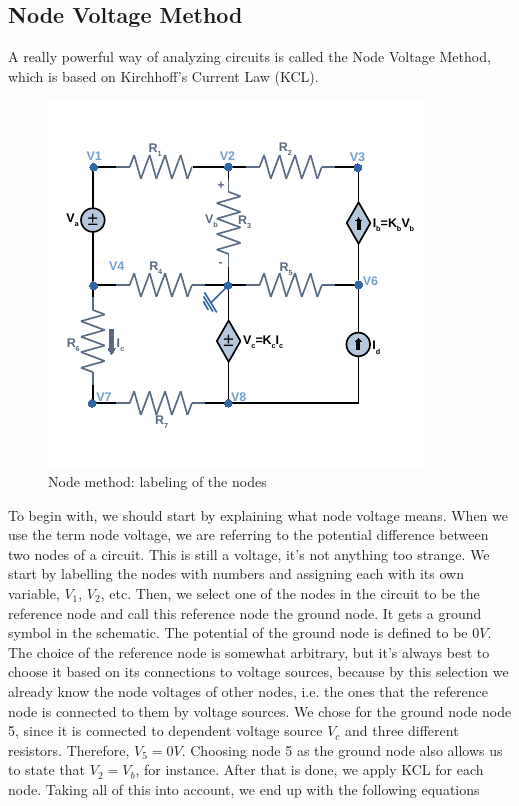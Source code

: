 \subsection{Node Voltage Method}
\label{node method}

\par A really powerful way of analyzing circuits is called the Node Voltage Method, which is based on Kirchhoff's Current Law (KCL).

\begin{figure}[h] \centering
\includegraphics[width=0.8\linewidth]{nodes.pdf}
\caption{Node method: labeling of the nodes}
\label{fig:forced}
\end{figure}

To begin with, we should start by explaining what node voltage means. When we use the term node voltage, we are referring to the potential difference between two nodes of a circuit. This is still a voltage, it's not anything too strange. We start by labelling the nodes with numbers and assigning each with its own variable, $V_1$, $V_2$, etc. Then, we select one of the nodes in the circuit to be the reference node and call this reference node the ground node. It gets a ground symbol in the schematic. The potential of the ground node is defined to be $0 V$. The choice of the reference node is somewhat arbitrary, but it's always best to choose it based on its connections to voltage sources, because by this selection we already know the node voltages of other nodes, i.e. the ones that the reference node is connected to them by voltage sources. We chose for the ground node node 5, since it is connected to dependent voltage source $V_c$ and three different resistors. Therefore, $V_5 = 0 V$. Choosing node 5 as the ground node also allows us to state that $V_2 = V_b$, for instance. After that is done, we apply KCL for each node. Taking all of this into account, we end up with the following equations

